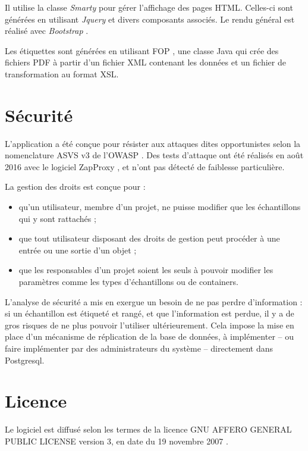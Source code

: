 Il utilise la classe \textit{Smarty} \cite{smarty} pour gérer l'affichage des pages HTML. Celles-ci sont générées en utilisant \textit{Jquery} \cite{jquery}  et divers composants associés. Le rendu général est réalisé avec \textit{Bootstrap} \cite{bootstrap}.

Les étiquettes sont générées en utilisant FOP \cite{fop}, une classe Java qui crée des fichiers PDF à partir d'un fichier XML contenant les données et un fichier de transformation au format XSL.

\section{Sécurité}

L'application a été conçue pour résister aux attaques dites opportunistes selon la nomenclature ASVS v3 \cite{asvs} de l'OWASP \cite{owasp}. Des tests d'attaque ont été réalisés en août 2016 avec le logiciel ZapProxy \cite{zaproxy}, et n'ont pas détecté de faiblesse particulière.

La gestion des droits est conçue pour :
\begin{itemize}
\item qu'un utilisateur, membre d'un projet, ne puisse modifier que les échantillons qui y sont rattachés ;
\item que tout utilisateur disposant des droits de gestion peut procéder à une entrée ou une sortie d'un objet ;
\item que les responsables d'un projet soient les seuls à pouvoir modifier les paramètres comme les types d'échantillons ou de containers.
\end{itemize}
L'analyse de sécurité a mis en exergue un besoin de ne pas perdre d'information : si un échantillon est étiqueté et rangé, et que l'information est perdue, il y a de gros risques de ne plus pouvoir l'utiliser ultérieurement. Cela impose la mise en place d'un mécanisme de réplication de la base de données, à implémenter -- ou faire implémenter par des administrateurs du système -- directement dans Postgresql.

\section{Licence}
Le logiciel est diffusé selon les termes de la licence GNU AFFERO GENERAL PUBLIC LICENSE version 3, en date du 19 novembre 2007 \cite{agpl}.